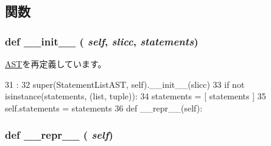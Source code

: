 \subsection{関数}
\hypertarget{classslicc_1_1ast_1_1StatementListAST_1_1StatementListAST_ac775ee34451fdfa742b318538164070e}{
\subsubsection[{\_\-\_\-init\_\-\_\-}]{\setlength{\rightskip}{0pt plus 5cm}def \_\-\_\-init\_\-\_\- ( {\em self}, \/   {\em slicc}, \/   {\em statements})}}
\label{classslicc_1_1ast_1_1StatementListAST_1_1StatementListAST_ac775ee34451fdfa742b318538164070e}


\hyperlink{classslicc_1_1ast_1_1AST_1_1AST_ac775ee34451fdfa742b318538164070e}{AST}を再定義しています。


\begin{DoxyCode}
31                                          :
32         super(StatementListAST, self).__init__(slicc)
33         if not isinstance(statements, (list, tuple)):
34             statements = [ statements ]
35         self.statements = statements
36 
    def __repr__(self):
\end{DoxyCode}
\hypertarget{classslicc_1_1ast_1_1StatementListAST_1_1StatementListAST_ad8b9328939df072e4740cd9a63189744}{
\subsubsection[{\_\-\_\-repr\_\-\_\-}]{\setlength{\rightskip}{0pt plus 5cm}def \_\-\_\-repr\_\-\_\- ( {\em self})}}
\label{classslicc_1_1ast_1_1StatementListAST_1_1StatementListAST_ad8b9328939df072e4740cd9a63189744}




